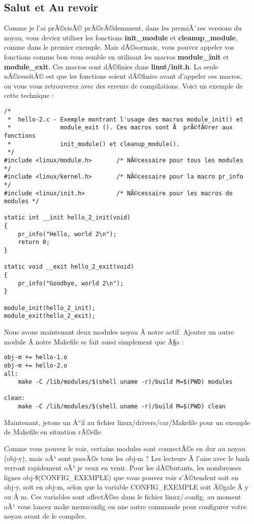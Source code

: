 \documentclass[11pt]{article}
\begin{document}
\subsection*{Salut et Au revoir}
\label{sec-4-2}

Comme je l'ai prÃ©cisÃ© prÃ©cÃ©demment, dans les premiÃ¨res versions du noyau, vous deviez utiliser les fonctions \textbf{init\_module} et \textbf{cleanup\_module}, comme dans le premier exemple. Mais dÃ©sormais, vous pouvez appeler vos fonctions comme bon vous semble en utilisant les macros \textbf{module\_init} et \textbf{module\_exit}. Ces macros sont dÃ©finies dans \textbf{linut/init.h}. La seule nÃ©cessitÃ© est que les fonctions soient dÃ©finies avant d'appeler ces macros, ou vous vous retrouverez avec des erreurs de compilations. Voici un exemple de cette technique :

\begin{verbatim}
/*
 *  hello-2.c - Exemple montrant l'usage des macros module_init() et
 *              module_exit (). Ces macros sont Ã  prÃ©fÃ©rer aux fonctions
 *              init_module() et cleanup_module().
 */
#include <linux/module.h>       /* NÃ©cessaire pour tous les modules */
#include <linux/kernel.h>       /* NÃ©cessaire pour la macro pr_info */
#include <linux/init.h>         /* NÃ©cessaire pour les macros de modules */

static int __init hello_2_init(void)
{
    pr_info("Hello, world 2\n");
    return 0;
}

static void __exit hello_2_exit(void)
{
    pr_info("Goodbye, world 2\n");
}

module_init(hello_2_init);
module_exit(hello_2_exit);
\end{verbatim}

Nous avons maintenant deux modules noyau Ã  notre actif. Ajouter un autre module Ã  notre Makefile se fait aussi simplement que Ã§a :

\begin{verbatim}
obj-m += hello-1.o
obj-m += hello-2.o
all:
    make -C /lib/modules/$(shell uname -r)/build M=$(PWD) modules

clean:
    make -C /lib/modules/$(shell uname -r)/build M=$(PWD) clean
\end{verbatim}

Maintenant, jetons un Å“il au fichier linux/drivers/car/Makefile pour un exemple de Makefile en situation rÃ©elle.

Comme vous pouvez le voir, certains modules sont connectÃ©s en dur au noyau (obj-y), mais oÃ¹ sont passÃ©s tous les obj-m ? Les lecteurs Ã  l'aise avec le bash verront rapidement oÃ¹ je veux en venir. Pour les dÃ©butants, les nombreuses lignes obj-\$(CONFIG\_EXEMPLE) que vous pouvez voir s'Ã©tendent soit en obj-y, soit en obj-m, selon que la variable CONFIG\_EXEMPLE soit Ã©gale Ã  y ou Ã  m. Ces variables sont affectÃ©es dans le fichier linux/.config, au moment oÃ¹ vous lancez make menuconfig ou une autre commande pour configurer votre noyau avant de le compiler.
\end{document}
